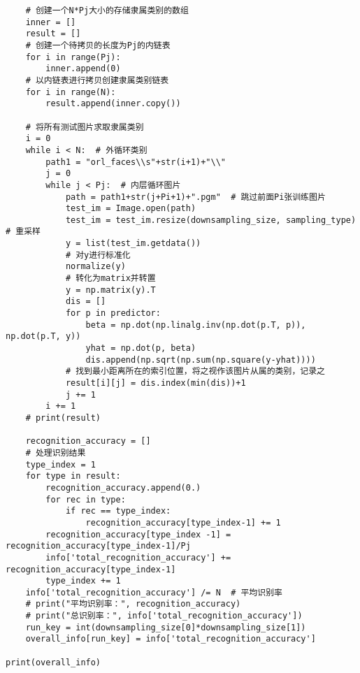 \begin{verbatim}
    # 创建一个N*Pj大小的存储隶属类别的数组
    inner = []
    result = []
    # 创建一个待拷贝的长度为Pj的内链表
    for i in range(Pj):
        inner.append(0)
    # 以内链表进行拷贝创建隶属类别链表
    for i in range(N):
        result.append(inner.copy())

    # 将所有测试图片求取隶属类别
    i = 0
    while i < N:  # 外循环类别
        path1 = "orl_faces\\s"+str(i+1)+"\\"
        j = 0
        while j < Pj:  # 内层循环图片
            path = path1+str(j+Pi+1)+".pgm"  # 跳过前面Pi张训练图片
            test_im = Image.open(path)
            test_im = test_im.resize(downsampling_size, sampling_type)  # 重采样
            y = list(test_im.getdata())
            # 对y进行标准化
            normalize(y)
            # 转化为matrix并转置
            y = np.matrix(y).T
            dis = []
            for p in predictor:
                beta = np.dot(np.linalg.inv(np.dot(p.T, p)), np.dot(p.T, y))
                yhat = np.dot(p, beta)
                dis.append(np.sqrt(np.sum(np.square(y-yhat))))
            # 找到最小距离所在的索引位置，将之视作该图片从属的类别，记录之
            result[i][j] = dis.index(min(dis))+1
            j += 1
        i += 1
    # print(result)

    recognition_accuracy = []
    # 处理识别结果
    type_index = 1
    for type in result:
        recognition_accuracy.append(0.)
        for rec in type:
            if rec == type_index:
                recognition_accuracy[type_index-1] += 1
        recognition_accuracy[type_index -1] = recognition_accuracy[type_index-1]/Pj
        info['total_recognition_accuracy'] += recognition_accuracy[type_index-1]
        type_index += 1
    info['total_recognition_accuracy'] /= N  # 平均识别率
    # print("平均识别率：", recognition_accuracy)
    # print("总识别率：", info['total_recognition_accuracy'])
    run_key = int(downsampling_size[0]*downsampling_size[1])
    overall_info[run_key] = info['total_recognition_accuracy']

print(overall_info)
\end{verbatim}
